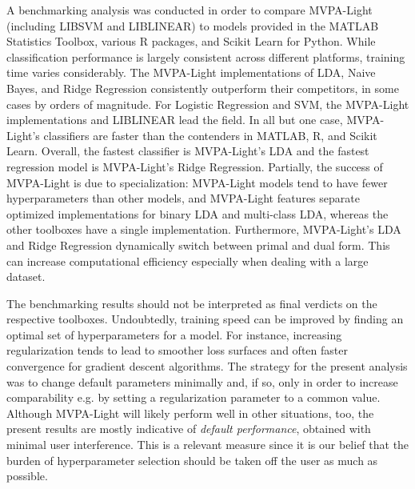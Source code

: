 \documentclass[utf8]{frontiersSCNS} %
\begin{document}
A benchmarking analysis was conducted in order to compare MVPA-Light (including LIBSVM and LIBLINEAR) to models provided in the MATLAB Statistics Toolbox, various R packages, and Scikit Learn  for Python. While classification performance is largely consistent across different platforms, training time varies considerably. The MVPA-Light implementations of LDA, Naive Bayes, and Ridge Regression consistently outperform  their competitors, in some cases by orders of magnitude. For Logistic Regression and SVM, the MVPA-Light implementations and LIBLINEAR lead the field. In all but one case, MVPA-Light's classifiers are faster than the contenders in MATLAB, R, and Scikit Learn. Overall, the fastest classifier is MVPA-Light's LDA and the fastest regression model is MVPA-Light's Ridge Regression. Partially, the success of MVPA-Light is due to specialization: MVPA-Light models tend to have fewer hyperparameters than other models, and MVPA-Light features separate optimized implementations for binary LDA and multi-class LDA, whereas the other toolboxes have a single implementation. Furthermore, MVPA-Light's LDA and Ridge Regression dynamically switch between primal and dual form. This can increase computational efficiency especially when dealing with a large dataset.

The benchmarking results should not be interpreted as final verdicts on the respective toolboxes.
 Undoubtedly, training speed can be improved by finding an optimal set of hyperparameters for a model. For instance, increasing regularization tends to lead to smoother loss surfaces and often faster convergence for gradient descent algorithms. The strategy for the present analysis was to change default parameters minimally and, if so, only in order to increase comparability e.g. by setting a regularization parameter to a common value.
 Although MVPA-Light will likely perform well in other situations, too, the present results are mostly indicative of \textit{default performance}, obtained with minimal user interference. This is a relevant measure since it is our belief that the burden of hyperparameter selection should be taken off the user as much as possible.


\end{document}
